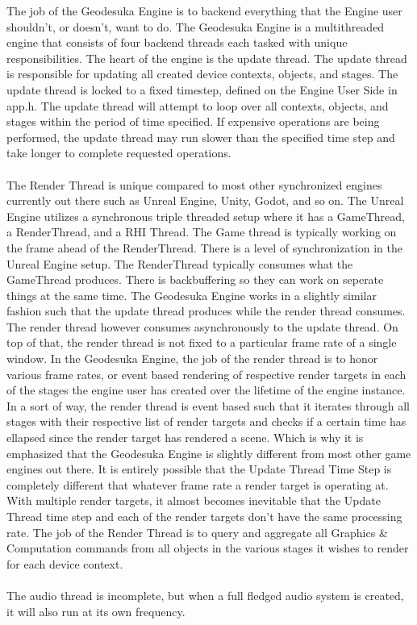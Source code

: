 \documentclass[a4paper,10pt]{book}
\begin{document}
The job of the Geodesuka Engine is to backend everything that the Engine user shouldn't, or doesn't, want to do. The Geodesuka Engine is a multithreaded engine that consists of four
backend threads each tasked with unique responsibilities. The heart of the engine is the update thread. The update thread is responsible for updating all created device contexts, 
objects, and stages. The update thread is locked to a fixed timestep, defined on the Engine User Side in app.h. The update thread will attempt to loop over all contexts, objects, 
and stages within the period of time specified. If expensive operations are being performed, the update thread may run slower than the specified time step and take longer to complete
requested operations. \\ \\
The Render Thread is unique compared to most other synchronized engines currently out there such as Unreal Engine, Unity, Godot, and so on. The Unreal Engine utilizes a synchronous triple
threaded setup where it has a GameThread, a RenderThread, and a RHI Thread. The Game thread is typically working on the frame ahead of the RenderThread. There is a level of synchronization
in the Unreal Engine setup. The RenderThread typically consumes what the GameThread produces. There is backbuffering so they can work on seperate things at the same time. The Geodesuka
Engine works in a slightly similar fashion such that the update thread produces while the render thread consumes. The render thread however consumes asynchronously to the update thread.
On top of that, the render thread is not fixed to a particular frame rate of a single window. In the Geodesuka Engine, the job of the render thread is to honor various frame rates, or event based
rendering of respective render targets in each of the stages the engine user has created over the lifetime of the engine instance. In a sort of way, the render thread is event based such that it
iterates through all stages with their respective list of render targets and checks if a certain time has ellapsed since the render target has rendered a scene. Which is why it is emphasized that
the Geodesuka Engine is slightly different from most other game engines out there. It is entirely possible that the Update Thread Time Step is completely different that whatever frame rate a 
render target is operating at. With multiple render targets, it almost becomes inevitable that the Update Thread time step and each of the render targets don't have the same processing rate. 
The job of the Render Thread is to query and aggregate all Graphics \& Computation commands from all objects in the various stages it wishes to render for each device context. \\ \\
The audio thread is incomplete, but when a full fledged audio system is created, it will also run at its own frequency. 
\end{document}
